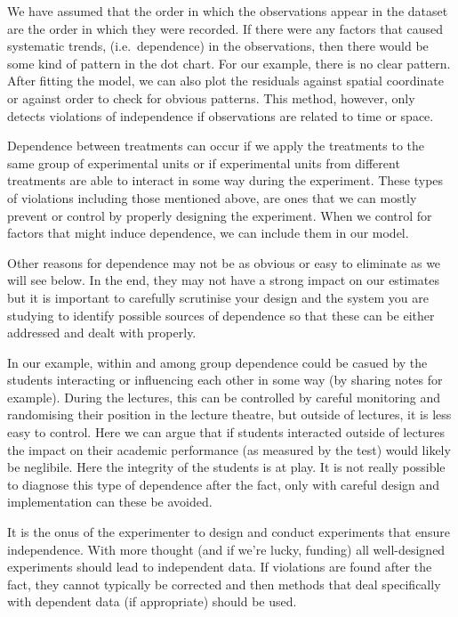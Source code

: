 \documentclass[
  letterpaper,
  DIV=11,
  numbers=noendperiod,
  oneside]{scrreprt}
\begin{document}
We have assumed that the order in which the observations appear in the
dataset are the order in which they were recorded. If there were any
factors that caused systematic trends, (i.e.~dependence) in the
observations, then there would be some kind of pattern in the dot chart.
For our example, there is no clear pattern. After fitting the model, we
can also plot the residuals against spatial coordinate or against order
to check for obvious patterns. This method, however, only detects
violations of independence if observations are related to time or space.

Dependence between treatments can occur if we apply the treatments to
the same group of experimental units or if experimental units from
different treatments are able to interact in some way during the
experiment. These types of violations including those mentioned above,
are ones that we can mostly prevent or control by properly designing the
experiment. When we control for factors that might induce dependence, we
can include them in our model.

Other reasons for dependence may not be as obvious or easy to eliminate
as we will see below. In the end, they may not have a strong impact on
our estimates but it is important to carefully scrutinise your design
and the system you are studying to identify possible sources of
dependence so that these can be either addressed and dealt with
properly.

In our example, within and among group dependence could be casued by the
students interacting or influencing each other in some way (by sharing
notes for example). During the lectures, this can be controlled by
careful monitoring and randomising their position in the lecture
theatre, but outside of lectures, it is less easy to control. Here we
can argue that if students interacted outside of lectures the impact on
their academic performance (as measured by the test) would likely be
neglibile. Here the integrity of the students is at play. It is not
really possible to diagnose this type of dependence after the fact, only
with careful design and implementation can these be avoided.

It is the onus of the experimenter to design and conduct experiments
that ensure independence. With more thought (and if we're lucky,
funding) all well-designed experiments should lead to independent data.
If violations are found after the fact, they cannot typically be
corrected and then methods that deal specifically with dependent data
(if appropriate) should be used.
\end{document}
